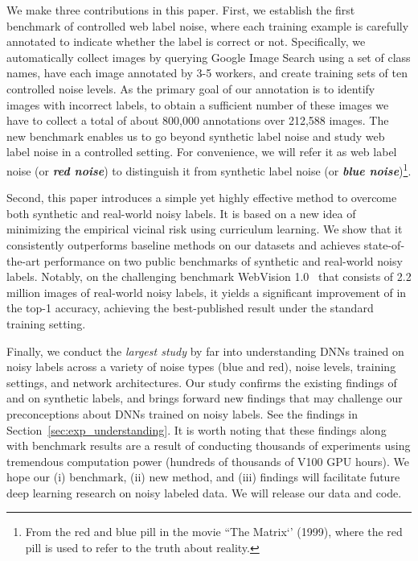 \documentclass{article}
\begin{document}
We make three contributions in this paper. First, we establish the first benchmark of controlled web label noise, where each training example is carefully annotated to indicate whether the label is correct or not. Specifically, we automatically collect images by querying Google Image Search using a set of class names, have each image annotated by 3-5 workers, and create training sets of ten controlled noise levels. As the primary goal of our annotation is to identify images with incorrect labels, to obtain a sufficient number of these images we have to collect a total of about 800,000 annotations over 212,588 images. The new benchmark enables us to go beyond synthetic label noise and study web label noise in a controlled setting. For convenience, we will refer it as web label noise (or \textbf{\emph{red noise}}) to distinguish it from synthetic label noise (or \textbf{\emph{blue noise}})\footnote{From the red and blue pill in the movie ``The Matrix‘’ (1999), where the red pill is used to refer to the truth about reality.}.

Second, this paper introduces a simple yet highly effective method to overcome both synthetic and real-world noisy labels. It is based on a new idea of minimizing the empirical vicinal risk using curriculum learning. We show that it consistently outperforms baseline methods on our datasets and achieves state-of-the-art performance on two public benchmarks of synthetic and real-world noisy labels. Notably, on the challenging benchmark WebVision 1.0~\citep{li2017webvision} that consists of 2.2 million images of real-world noisy labels, it yields a significant improvement of  in the top-1 accuracy, achieving the best-published result under the standard training setting.

Finally, we conduct the \emph{largest study} by far into understanding DNNs trained on noisy labels across a variety of noise types (blue and red), noise levels, training settings, and network architectures. Our study confirms the existing findings of \citet{zhang2017understanding} and \citet{arpit2017closer} on synthetic labels, and brings forward new findings that may challenge our preconceptions about DNNs trained on noisy labels. See the findings in Section~\ref{sec:exp_understanding}. It is worth noting that these findings along with benchmark results are a result of conducting thousands of experiments using tremendous computation power (hundreds of thousands of V100 GPU hours). We hope our (i) benchmark, (ii) new method, and (iii) findings will facilitate future deep learning research on noisy labeled data. We will release our data and code.
\end{document}
